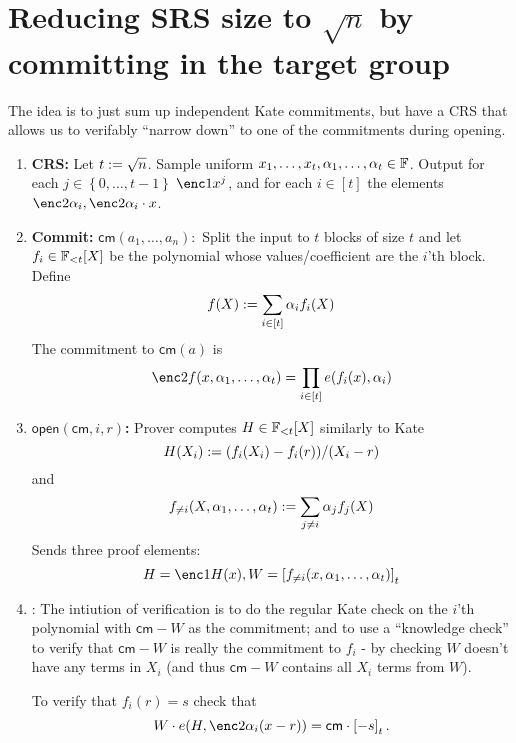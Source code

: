 \documentclass[11pt]{article}
\numberwithin{figure}{section} %
\newcommand{\cm}{\ensuremath{\mathsf{cm}}\xspace}
\newcommand{\open}{\ensuremath{\mathsf{open}}\xspace}
\newcommand{\set}[1]{\ensuremath{\left\{#1\right\}}\xspace}
\begin{document}
  \section{Reducing SRS size to $\sqrt{n}$ by committing in the target group}
 The idea is to just sum up independent Kate commitments, but have a CRS that allows us to verifably ``narrow down'' to one of the commitments during opening.
 \begin{enumerate}
  \item \textbf{CRS:} Let $t:= \sqrt n$. Sample uniform $x_1,\ldots,x_t,\alpha_1,\ldots,\alpha_t\in {\mathbb F}$. Output for each  $j\in \set{0,\ldots, t-1}$ $\enc1{x^j}$, and for each $i\in [t]$ the elements $\enc2{\alpha_i},\enc2{\alpha_i\cdot x}$.
  \item \textbf{Commit:} $\cm(a_1,\ldots,a_n):$ Split the input to $t$ blocks of size $t$ and let $f_i\in{\mathbb F}_{< t}[X]$ be the polynomial whose values/coefficient are the $i$'th block.
  Define
  \[f(X):= \sum_{i\in [t]} \alpha_i f_i(X)  \]
  The commitment  to $\cm(a)$ is 
  \[\enc2{f(x,\alpha_1,\ldots,\alpha_t)} = \prod_{i\in [t]} e(f_i(x),\alpha_i)\]
  \item \textbf{$\open(\cm,i,r)$:}  Prover computes $H\in {\mathbb F}_{< t}[X]$ similarly to Kate
  \[H(X_i):= (f_i(X_i)-f_i(r))/(X_i-r)\]
  and 
  \[f_{\neq i}(X,\alpha_1,\ldots,\alpha_t):=\sum_{j\neq i} \alpha_j f_j(X)\]
  Sends three proof elements:
  \[H=\enc1{H(x)},W=\enct{f_{\neq i}(x,\alpha_1,\ldots,\alpha_t)}\] 
  \item \verify{\cm,H,W,W',i,r,s}: The intiution of verification is to do the regular Kate check on the $i$'th polynomial with $\cm-W$ as the commitment; and to use a ``knowledge check'' to verify that $\cm-W$ is really the commitment to $f_i$ - by checking $W$ doesn't have any terms in $X_i$ (and thus $\cm-W$ contains all $X_i$ terms from $W$).
  
  To verify that $f_i(r)=s$  check that
  \[W\cdot e(H,\enc2{\alpha_i(x-r)})= \cm \cdot \enct{-s}.\]
  \end{enumerate}

  
  
 

\end{document}
